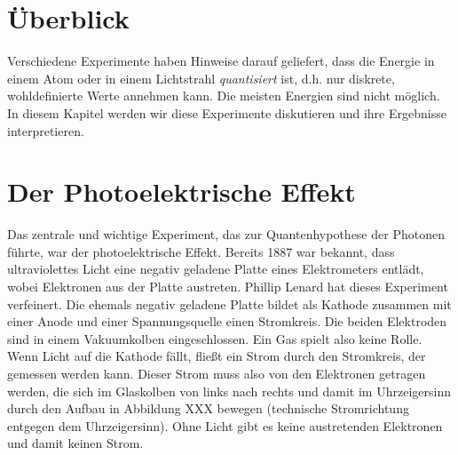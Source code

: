 

\section{Überblick}

Verschiedene Experimente haben Hinweise darauf geliefert, dass die Energie in einem Atom oder in einem Lichtstrahl \emph{quantisiert} ist, d.h. nur diskrete, wohldefinierte Werte annehmen kann. Die meisten Energien sind nicht möglich. In diesem Kapitel werden wir diese Experimente diskutieren und ihre Ergebnisse interpretieren.

\section{Der Photoelektrische Effekt}

Das zentrale und wichtige Experiment, das zur Quantenhypothese der Photonen führte, war der photoelektrische Effekt. Bereits 1887 war bekannt, dass ultraviolettes Licht eine negativ geladene Platte eines Elektrometers entlädt, wobei Elektronen aus der Platte austreten. Phillip Lenard hat dieses Experiment verfeinert. Die ehemals negativ geladene Platte bildet als Kathode zusammen mit einer Anode und einer Spannungsquelle einen Stromkreis. Die beiden Elektroden sind in einem Vakuumkolben eingeschlossen. Ein Gas spielt also keine Rolle. Wenn Licht auf die Kathode fällt, fließt ein Strom durch den Stromkreis, der gemessen werden kann. Dieser Strom muss also von den Elektronen getragen werden, die sich im Glaskolben von links nach rechts und damit im Uhrzeigersinn durch den Aufbau in Abbildung XXX bewegen (technische Stromrichtung entgegen dem Uhrzeigersinn). Ohne Licht gibt es keine austretenden Elektronen und damit keinen Strom.


